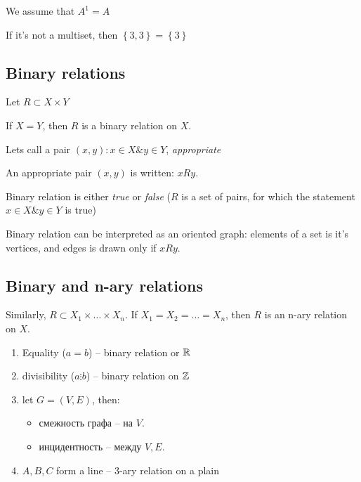 We assume that $A^{1} = A$

If it's not a multiset, then $\left\{ 3, 3 \right\} = \left\{ 3 \right\}$
 
\subsection{Binary relations}

Let $R \subset X \times Y$


If $X = Y$, then  $R$ is a binary relation on $X$.

Lets call a pair $(x,y) : x \in X \& y \in Y$, {\it{appropriate}} 

An appropriate pair $(x,y)$ is written: $xRy$.

\begin{note}[]
	Binary relation is either {\it{true}} or {\it{false}} ($R$ is a set of pairs, for which the statement $x \in X \& y \in Y$ is true)
\end{note}

\begin{note}[]
	Binary relation can be interpreted as an oriented graph: elements of a set is it's vertices, and edges is drawn only if $xRy$.
\end{note}

\subsection{Binary and n-ary relations}
Similarly, $R \subset X_1 \times \dots \times X_n$. If $X_1 = X_2 = \dots = X_n$, then $R$ is an n-ary relation on $X$.

\begin{example}[]
	\begin{enumerate}
		\item Equality ($a = b$) -- binary relation or $\mathbb{R}$ 
		\item divisibility ($a \vdots b$) -- binary relation on $\mathbb{Z}$
		\item let $G = (V, E)$, then:
			 \begin{itemize}
				\item смежность графа --  на $V$.
				\item инцидентность -- между $V, E$.
			\end{itemize}
		\item $A,B,C$ form a line -- 3-ary relation on a plain
	\end{enumerate}
\end{example}

